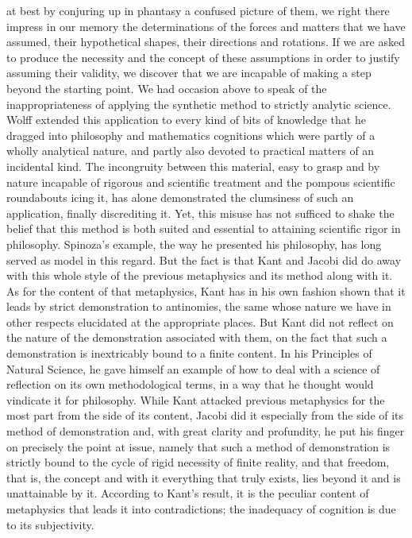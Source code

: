 at best by conjuring up in phantasy a confused picture of them,
we right there impress in our memory the determinations
of the forces and matters that we have assumed,
their hypothetical shapes, their directions and rotations.
If we are asked to produce the necessity
and the concept of these assumptions
in order to justify assuming their validity,
we discover that we are incapable of making
a step beyond the starting point.
We had occasion above to speak of
the inappropriateness of applying the
synthetic method to strictly analytic science.
Wolff extended this application to
every kind of bits of knowledge
that he dragged into philosophy and mathematics
cognitions which were partly of a wholly analytical nature,
and partly also devoted to
practical matters of an incidental kind.
The incongruity between this material,
easy to grasp and by nature incapable of
rigorous and scientific treatment
and the pompous scientific roundabouts icing it,
has alone demonstrated the clumsiness of such an application,
finally discrediting it.
Yet, this misuse has not sufficed to
shake the belief that this method is
both suited and essential to attaining scientific rigor in philosophy.
Spinoza's example, the way he presented his philosophy,
has long served as model in this regard.
But the fact is that Kant and Jacobi
did do away with this whole style of
the previous metaphysics
and its method along with it.
As for the content of that metaphysics,
Kant has in his own fashion shown that it leads
by strict demonstration to antinomies,
the same whose nature we have in other respects
elucidated at the appropriate places.
But Kant did not reflect on the nature of
the demonstration associated with them,
on the fact that such a demonstration is
inextricably bound to a finite content.
In his Principles of Natural Science,
he gave himself an example of how to
deal with a science of reflection on
its own methodological terms,
in a way that he thought would
vindicate it for philosophy.
While Kant attacked previous metaphysics
for the most part from the side of its content,
Jacobi did it especially from the side
of its method of demonstration
and, with great clarity and profundity,
he put his finger on precisely the point at issue,
namely that such a method of demonstration is
strictly bound to the cycle of rigid necessity
of finite reality,
and that freedom, that is, the concept
and with it everything that truly exists,
lies beyond it and is unattainable by it.
According to Kant's result,
it is the peculiar content of metaphysics
that leads it into contradictions;
the inadequacy of cognition is due to its subjectivity.
